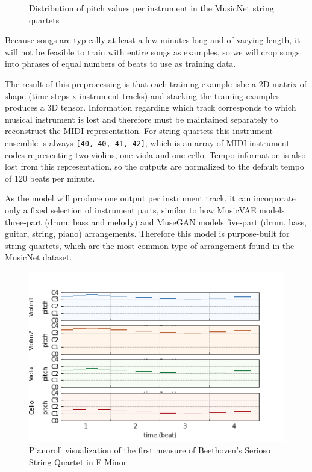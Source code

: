 \documentclass[sigconf,authorversion]{acmart}
\begin{document}
\begin{figure}[htbp]
    \begin{center}
        \scalebox{0.6}{}
    \end{center}
    \caption{Distribution of pitch values per instrument in the MusicNet string quartets}
    \label{pitch_dist}
\end{figure}

Because songs are typically at least a few minutes long and of varying
length, it will not be feasible to train with entire songs as
examples, so we will crop songs into phrases of equal numbers of
beats to use as training data.

The result of this preprocessing is that each training example isbe a
2D matrix of shape (time steps x instrument tracks) and stacking the
training examples produces a 3D tensor. Information regarding which
track corresponds to which musical instrument is lost and therefore
must be maintained separately to reconstruct the MIDI
representation. For string quartets this instrument ensemble is always
\texttt{[40, 40, 41, 42]}, which is an array of MIDI instrument codes
representing two violins, one viola and one cello. Tempo information
is also lost from this representation, so the outputs are normalized
to the default tempo of 120 beats per minute.

As the model will produce one output per instrument track, it can
incorporate only a fixed selection of instrument parts, similar to how
MusicVAE models three-part (drum, bass and melody)
\cite{roberts_hierarchical_2018} and MuseGAN models five-part (drum,
bass, guitar, string, piano) arrangements. Therefore this model is
purpose-built for string quartets, which are the most common type of
arrangement found in the MusicNet dataset.

\begin{figure}[h]
  \centering
  \includegraphics[width=\linewidth]{figures/first_bar.png}
  \caption{Pianoroll visualization of the first measure of
    Beethoven's Serioso String Quartet in F Minor}
  \label{pianoroll}
\end{figure}
\end{document}

